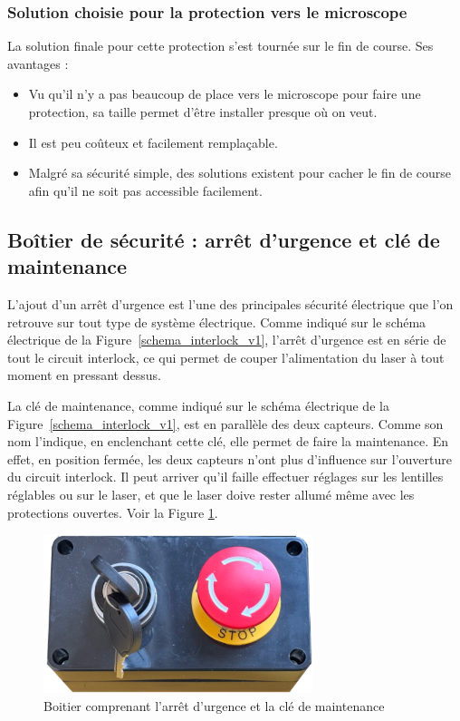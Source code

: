 \subsubsection{Solution choisie pour la protection vers le microscope}
La solution finale pour cette protection s'est tournée sur le fin de course. Ses avantages :
\begin{itemize}
    \item Vu qu'il n'y a pas beaucoup de place vers le microscope pour faire une protection, sa taille permet d'être installer presque où on veut.
    \item Il est peu coûteux et facilement remplaçable.
    \item Malgré sa sécurité simple, des solutions existent pour cacher le fin de course afin qu'il ne soit pas accessible facilement.
\end{itemize}

\subsection{Boîtier de sécurité : arrêt d'urgence et clé de maintenance}
\label{subsec:arret_urgence_maintenance}
L'ajout d'un arrêt d'urgence est l'une des principales sécurité électrique que l'on retrouve sur tout type de système électrique. Comme indiqué sur le schéma électrique de la Figure~\ref{schema_interlock_v1}, l'arrêt d'urgence est en série de tout le circuit interlock, ce qui permet de couper l'alimentation du laser à tout moment en pressant dessus.

La clé de maintenance, comme indiqué sur le schéma électrique de la Figure~\ref{schema_interlock_v1}, est en parallèle des deux capteurs. Comme son nom l'indique, en enclenchant cette clé, elle permet de faire la maintenance. En effet, en position fermée, les deux capteurs n'ont plus d'influence sur l'ouverture du circuit interlock. Il peut arriver qu'il faille effectuer réglages sur les lentilles réglables ou sur le laser, et que le laser doive rester allumé même avec les protections ouvertes. Voir la Figure \ref{boitier_arret_urgence_maintenance}.

\begin{figure}[H]
    \begin{center}
        \includegraphics[width=0.7\textwidth]{assets/figures/Protections_laser/boitier_arret_urgence_maintenance.png}
    \end{center}
    \caption{Boitier comprenant l'arrêt d'urgence et la clé de maintenance}
    \label{boitier_arret_urgence_maintenance}
\end{figure}


